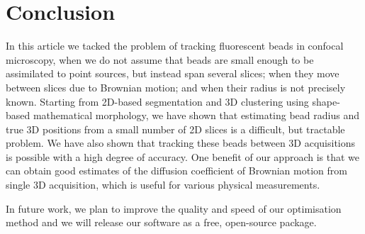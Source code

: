\documentclass{llncs}
\begin{document}
\section{Conclusion}\label{sec:Conclusion}
In this article we tacked the problem of tracking fluorescent beads in 
confocal microscopy, when we do not assume that beads are small enough to be assimilated to point sources, but instead span several slices; when they move between slices due to Brownian motion; and when their radius is not precisely known. Starting from 2D-based segmentation and 3D clustering using shape-based mathematical morphology, we have shown that estimating bead radius and true 3D positions from a small number of 2D slices is a difficult, but tractable problem. We have also shown that tracking these beads between 3D acquisitions is possible with a high degree of accuracy. One benefit of our approach is that we can obtain good estimates of the diffusion coefficient of Brownian motion from single 3D acquisition, which is useful for various physical measurements.

In future work, we plan to improve the quality and speed of our optimisation method and we will release our software as a free, open-source package.



\end{document}
